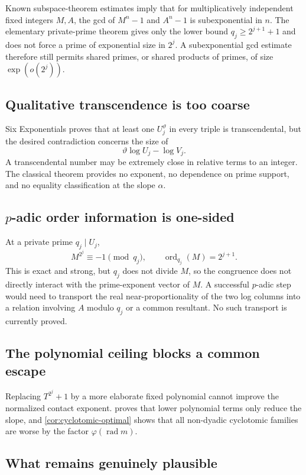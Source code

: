 \documentclass[11pt]{article}
\theoremstyle{definition}
\newcommand{\rad}{\operatorname{rad}}
\newcommand{\ord}{\operatorname{ord}}
\newcommand{\vphi}{\varphi}
\newcommand{\vtheta}{\vartheta}
\begin{document}
Known subspace-theorem estimates imply that for multiplicatively independent fixed
integers $M,A$, the gcd of $M^n-1$ and $A^n-1$ is subexponential in $n$.  The elementary
private-prime theorem gives only the lower bound $q_j\ge2^{j+1}+1$ and does not force a
prime of exponential size in $2^j$.  A subexponential gcd estimate therefore still permits
shared primes, or shared products of primes, of size $\exp(o(2^j))$.

\subsection{Qualitative transcendence is too coarse}

Six Exponentials proves that at least one $U_j^{\vtheta}$ in every triple is
transcendental, but the desired contradiction concerns the size of
\[
 \vtheta\log U_j-\log V_j.
\]
A transcendental number may be extremely close in relative terms to an integer.  The
classical theorem provides no exponent, no dependence on prime support, and no equality
classification at the slope $\alpha$.

\subsection{\texorpdfstring{$p$}{p}-adic order information is one-sided}

At a private prime $q_j\mid U_j$,
\[
 M^{2^j}\equiv-1\pmod{q_j},
 \qquad \ord_{q_j}(M)=2^{j+1}.
\]
This is exact and strong, but $q_j$ does not divide $M$, so the congruence does not directly
interact with the prime-exponent vector of $M$.  A successful $p$-adic step would need to
transport the real near-proportionality of the two log columns into a relation involving
$A$ modulo $q_j$ or a common resultant.  No such transport is currently proved.

\subsection{The polynomial ceiling blocks a common escape}

Replacing $T^{2^j}+1$ by a more elaborate fixed polynomial cannot improve the normalized
contact exponent.   proves that lower polynomial terms only
reduce the slope, and \cref{cor:cyclotomic-optimal} shows that all non-dyadic cyclotomic
families are worse by the factor $\vphi(\rad m)$.

\subsection{What remains genuinely plausible}
\end{document}
